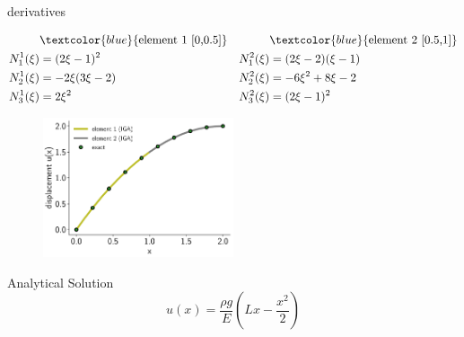 \documentclass{beamer}
\begin{document}
\begin{frame}[allowframebreaks]
\begin{minipage}[b]{0.48\linewidth}
    \centering \footnotesize{derivatives}
  \end{minipage}
  \begin{equation}\nonumber
    \begin{aligned}
       & \textcolor{blue}{\text{element 1 [0,0.5]}}  & & \textcolor{blue}{\text{element 2 [0.5,1]}} \\
      N_1^1(\xi) &=  (2 \xi -1)^2 & N_1^2(\xi) &= (2\xi-2)(\xi-1)  \\
      N_2^1(\xi) &= -2\xi(3\xi-2) &N_2^2(\xi) &= -6\xi^2 + 8\xi -2 \\
      N_3^1(\xi) &=  2\xi^2       & N_3^2(\xi) &= (2\xi -1)^2 \\
    \end{aligned}
  \end{equation}
  
  \newpage

  \begin{minipage}{\linewidth}
    \begin{figure}
    \centering
    \includegraphics[width=0.5\textwidth]{figures/bar-solution.pdf} \\
    \end{figure}
  \end{minipage}

  \begin{block}{Analytical Solution}
    \begin{equation}\nonumber
      u(x) = \frac{\rho g}{E} \left( Lx - \frac{x^2}{2}\right)
    \end{equation}
  \end{block}

\end{frame}

\end{document}
